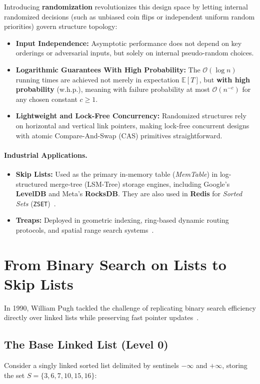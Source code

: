 Introducing \textbf{randomization} revolutionizes this design space by letting internal randomized decisions (such as unbiased coin flips or independent uniform random priorities) govern structure topology:
\begin{itemize}
  \item \textbf{Input Independence:} Asymptotic performance does not depend on key orderings or adversarial inputs, but solely on internal pseudo-random choices.
  \item \textbf{Logarithmic Guarantees With High Probability:} The $\mathcal{O}(\log n)$ running times are achieved not merely in expectation $\mathbb{E}[T]$, but \textbf{with high probability} (w.h.p.), meaning with failure probability at most $\mathcal{O}(n^{-c})$ for any chosen constant $c \ge 1$.
  \item \textbf{Lightweight and Lock-Free Concurrency:} Randomized structures rely on horizontal and vertical link pointers, making lock-free concurrent designs with atomic Compare-And-Swap (CAS) primitives straightforward.
\end{itemize}

\paragraph{Industrial Applications.}
\begin{itemize}
  \item \textbf{Skip Lists:} Used as the primary in-memory table (\textit{MemTable}) in log-structured merge-tree (LSM-Tree) storage engines, including Google's \textbf{LevelDB} and Meta's \textbf{RocksDB}. They are also used in \textbf{Redis} for \textit{Sorted Sets} (\texttt{ZSET})~\cite{pugh1990}.
  \item \textbf{Treaps:} Deployed in geometric indexing, ring-based dynamic routing protocols, and spatial range search systems~\cite{seidel1996}.
\end{itemize}

\FloatBarrier
\section{From Binary Search on Lists to Skip Lists}
\label{sec:binary-search-to-skip-list}

In 1990, William Pugh tackled the challenge of replicating binary search efficiency directly over linked lists while preserving fast pointer updates~\cite{pugh1990}.

\subsection{The Base Linked List (Level 0)}
Consider a singly linked sorted list delimited by sentinels $-\infty$ and $+\infty$, storing the set $S = \{3, 6, 7, 10, 15, 16\}$:

